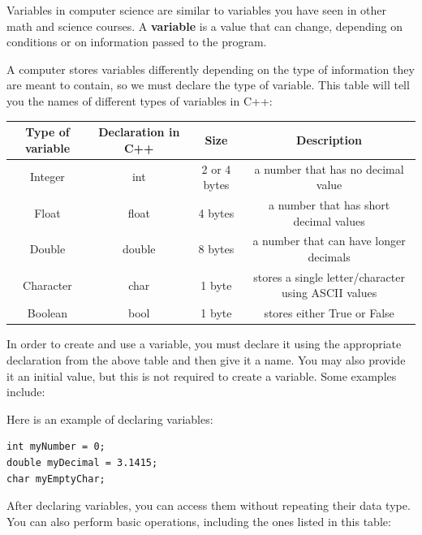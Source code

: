 Variables in computer science are similar to variables you have seen in other math and science courses. A \textbf{variable} is a value that can change, depending on conditions or on information passed to the program.

A computer stores variables differently depending on the type of information they are meant to contain, so we must declare the type of variable. This table will tell you the names of different types of variables in C++:

\begin{table}[H]
    \centering
    \begin{tabular}{c|c|c|c}\hline
         Type of variable & Declaration in C++ & Size & Description \\\hline
         Integer & int & 2 or 4 bytes & a number that has no decimal value \\
         Float & float & 4 bytes & a number that has short decimal values \\
         Double & double & 8 bytes & a number that can have longer decimals \\
         Character & char & 1 byte & stores a single letter/character using ASCII values \\
         Boolean & bool & 1 byte & stores either True or False 
    \end{tabular}
\end{table}

In order to create and use a variable, you must declare it using the appropriate declaration from the above table and then give it a name. You may also provide it an initial value, but this is not required to create a variable. Some examples include:

\begin{example}
Here is an example of declaring variables:
\begin{verbatim}
int myNumber = 0;
double myDecimal = 3.1415;
char myEmptyChar;
\end{verbatim}
\end{example}

After declaring variables, you can access them without repeating their data type. You can also perform basic operations, including the ones listed in this table:

